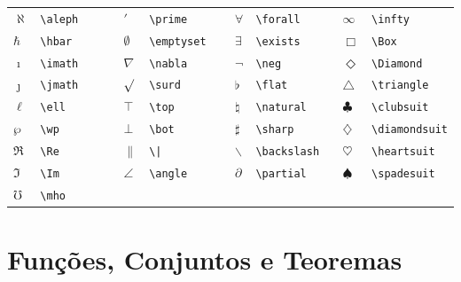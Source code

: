 \documentclass[fleqn]{icat-ufal}
\begin{document}
\begin{spacing}{1}
\begin{longtable}{p{4mm}p{26mm}p{4mm}p{26mm}p{4mm}p{26mm}p{4mm}p{26mm}} \hline
  $\aleph      $ & \lstinline!\aleph      ! &
  $\prime      $ & \lstinline!\prime      ! &
  $\forall     $ & \lstinline!\forall     ! &
  $\infty      $ & \lstinline!\infty      ! \\
  $\hbar       $ & \lstinline!\hbar       ! &
  $\emptyset   $ & \lstinline!\emptyset   ! &
  $\exists     $ & \lstinline!\exists     ! &
  $\Box        $ & \lstinline!\Box        ! \\
  $\imath      $ & \lstinline!\imath      ! &
  $\nabla      $ & \lstinline!\nabla      ! &
  $\neg        $ & \lstinline!\neg        ! &
  $\Diamond    $ & \lstinline!\Diamond    ! \\
  $\jmath      $ & \lstinline!\jmath      ! &
  $\surd       $ & \lstinline!\surd       ! &
  $\flat       $ & \lstinline!\flat       ! &
  $\triangle   $ & \lstinline!\triangle   ! \\
  $\ell        $ & \lstinline!\ell        ! &
  $\top        $ & \lstinline!\top        ! &
  $\natural    $ & \lstinline!\natural    ! &
  $\clubsuit   $ & \lstinline!\clubsuit   ! \\
  $\wp         $ & \lstinline!\wp         ! &
  $\bot        $ & \lstinline!\bot        ! &
  $\sharp      $ & \lstinline!\sharp      ! &
  $\diamondsuit$ & \lstinline!\diamondsuit! \\
  $\Re         $ & \lstinline!\Re         ! &
  $\|          $ & \lstinline!\|          ! &
  $\backslash  $ & \lstinline!\backslash  ! &
  $\heartsuit  $ & \lstinline!\heartsuit  ! \\
  $\Im         $ & \lstinline!\Im         ! &
  $\angle      $ & \lstinline!\angle      ! &
  $\partial    $ & \lstinline!\partial    ! &
  $\spadesuit  $ & \lstinline!\spadesuit  ! \\
  $\mho        $ & \lstinline!\mho        ! \\ \hline
\end{longtable}

\section{Funções, Conjuntos e Teoremas}



\end{spacing}
\end{document}

